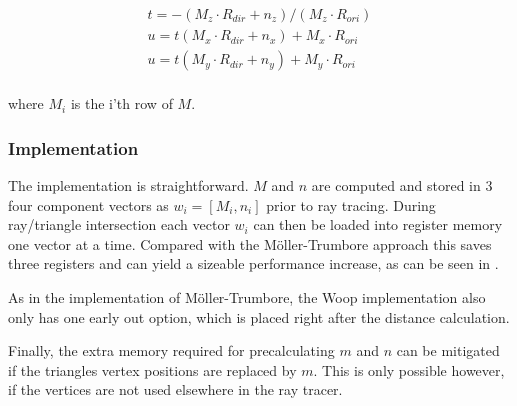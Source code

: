 \begin{displaymath}
  \begin{array}{l}
    t = - (M_z \cdot R_{dir} + n_z) / (M_z \cdot R_{ori}) \\
    u = t (M_x \cdot R_{dir} + n_x) + M_x \cdot R_{ori} \\
    u = t (M_y \cdot R_{dir} + n_y) + M_y \cdot R_{ori} \\
  \end{array}
\end{displaymath}

where $M_i$ is the i'th row of $M$.

\subsubsection{Implementation}

The implementation is straightforward. $M$ and $n$ are computed and stored in 3
four component vectors as $w_i = \left[M_i, n_i \right]$ prior to ray
tracing. During ray/triangle intersection each vector $w_i$ can then be loaded
into register memory one vector at a time. Compared with the Möller-Trumbore
approach this saves three registers and can yield a sizeable performance
increase, as can be seen in .


As in the implementation of Möller-Trumbore, the Woop implementation also only
has one early out option, which is placed right after the distance calculation.


Finally, the extra memory required for precalculating $m$ and $n$ can be
mitigated if the triangles vertex positions are replaced by $m$. This is only
possible however, if the vertices are not used elsewhere in the ray tracer.

